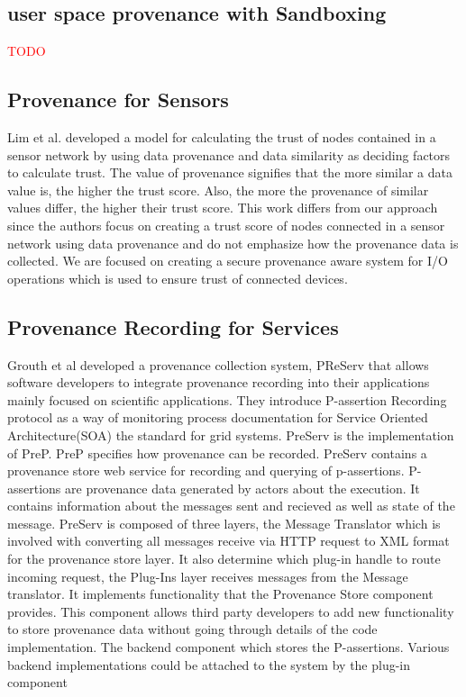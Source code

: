\subsection{user space provenance with Sandboxing}
\textcolor{red}{TODO}


\subsection{Provenance for Sensors}
Lim et al. developed a
model for calculating the trust of nodes contained in a sensor network by using data
provenance and data similarity as deciding factors to calculate trust. The value of
provenance signifies that the more similar a data value is, the higher the trust score.
Also, the more the provenance of similar values differ, the higher their trust score.
This work differs from our approach since the authors focus on creating a trust score
of nodes connected in a sensor network using data provenance and do not emphasize
how the provenance data is collected. We are focused on creating a secure
provenance aware system for I/O operations which is used to ensure trust of
connected devices.

\subsection{Provenance Recording for Services}
Grouth et al developed a provenance collection system, PReServ that allows software developers to integrate provenance recording into their applications mainly focused on scientific applications. They introduce P-assertion Recording protocol as a way of monitoring process  documentation for Service Oriented Architecture(SOA) the standard for grid systems. PreServ is the implementation of PreP. PreP specifies how provenance can be recorded.  PreServ contains a provenance store web service for recording and querying of p-assertions. P-assertions are provenance data generated by actors about the execution. It contains information about the messages sent and recieved as well as state of the message. PreServ is composed of three layers, the Message Translator which is involved with converting all messages receive via HTTP request to XML format for the provenance store layer. It also determine which plug-in handle to route incoming request, the  Plug-Ins layer receives messages from the Message translator. It implements functionality that the Provenance Store component provides. This component allows third party developers to add new functionality to store provenance data without going through details of the code implementation. The backend component which stores the P-assertions. Various backend implementations could be attached to the system by the plug-in component



